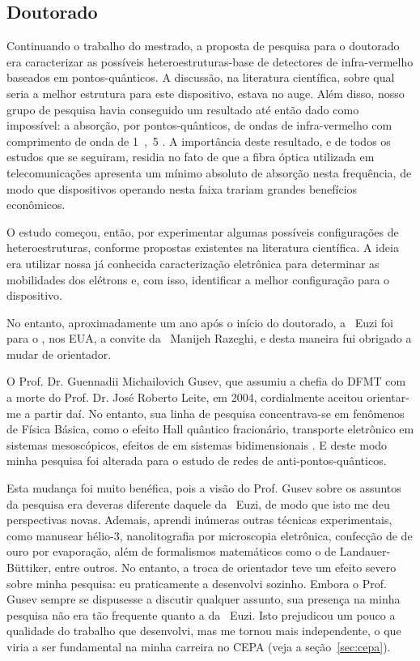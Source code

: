 \subsection{Doutorado}

Continuando o trabalho do mestrado, a proposta de pesquisa para o doutorado era caracterizar as possíveis heteroestruturas-base de detectores de infra-vermelho baseados em pontos-quânticos. A discussão, na literatura científica, sobre qual seria a melhor estrutura para este dispositivo, estava no auge. Além disso, nosso grupo de pesquisa havia conseguido um resultado até então dado como impossível: a absorção, por pontos-quânticos, de ondas de infra-vermelho com comprimento de onda de \unit{1,5}{\micro\metre} \cite{silva-2003}. A importância deste resultado, e de todos os estudos que se seguiram, residia no fato de que a fibra óptica utilizada em telecomunicações apresenta um mínimo absoluto de absorção nesta frequência, de modo que dispositivos operando nesta faixa trariam grandes benefícios econômicos.

O estudo começou, então, por experimentar algumas possíveis configurações de heteroestruturas, conforme propostas existentes na literatura científica. A ideia era utilizar nossa já conhecida caracterização eletrônica para determinar as mobilidades dos elétrons e, com isso, identificar a melhor configuração para o dispositivo.

No entanto, aproximadamente um ano após o início do doutorado, a \profa\ Euzi foi para o , nos EUA, a convite da \profa\ Manijeh Razeghi, e desta maneira fui obrigado a mudar de orientador.

O Prof. Dr. Guennadii Michailovich Gusev, que assumiu a chefia do DFMT com a morte do Prof. Dr. José Roberto Leite, em 2004, cordialmente aceitou orientar-me a partir daí. No entanto, sua linha de pesquisa concentrava-se em fenômenos de Física Básica, como o efeito Hall quântico fracionário, transporte eletrônico em sistemas mesoscópicos, efeitos de  em sistemas bidimensionais \etc. E deste modo minha pesquisa foi alterada para o estudo de redes de anti-pontos-quânticos.

Esta mudança foi muito benéfica, pois a visão do Prof. Gusev sobre os assuntos da pesquisa era deveras diferente daquele da \profa\ Euzi, de modo que isto me deu perspectivas novas. Ademais, aprendi inúmeras outras técnicas experimentais, como manusear hélio-3, nanolitografia por microscopia eletrônica, confecção de  de ouro por evaporação, além de formalismos matemáticos como o de Landauer-Büttiker, entre outros. No entanto, a troca de orientador teve um efeito severo sobre minha pesquisa: eu praticamente a desenvolvi sozinho. Embora o Prof. Gusev sempre se dispusesse a discutir qualquer assunto, sua presença na minha pesquisa não era tão frequente quanto a da \profa\ Euzi. Isto prejudicou um pouco a qualidade do trabalho que desenvolvi, mas me tornou mais independente, o que viria a ser fundamental na minha carreira no CEPA (veja a seção~\ref{sec:cepa}).

